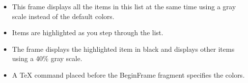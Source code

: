\documentclass[notes=show,beamer]{beamer}
\makeatletter
\newenvironment{stepitemizewithalert}{\begin{itemize}[<+-| alert@+>]}{\end{itemize} }
\makeatother
\begin{document}
\begin{frame}%



\begin{stepitemizewithalert}
\item This frame displays all the items in this list at the same time using
a gray scale instead of the default colors.

\item Items are highlighted as you step through the list.

\item The frame displays the highlighted item in black and displays other
items using a 40\% gray scale.

\item A TeX command placed before the BeginFrame fragment specifies the
colors.
\end{stepitemizewithalert}

\end{frame}%

\renewenvironment{stepitemizewithalert}{\begingroup\begin{itemize}[<0-| alert@+>]
\setbeamercolor{alerted text}{fg=black}
\setbeamercolor{unhighlighted text}{fg=black!20}\usebeamercolor[fg]{unhighlighted text}
}{\end{itemize}\endgroup }%
\end{document}
